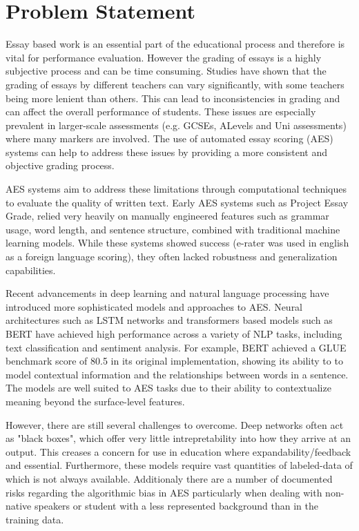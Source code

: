 \documentclass[11pt]{article}
\begin{document}
\section*{Problem Statement}
Essay based work is an essential part of the educational process and therefore is vital for performance evaluation. However
the grading of essays is a highly subjective process and can be time consuming. Studies have shown that the grading of essays
by different teachers can vary significantly, with some teachers being more lenient than others. This can lead to inconsistencies
in grading and can affect the overall performance of students. These issues are especially prevalent in larger-scale assessments 
(e.g. GCSEs, ALevels and Uni assessments) where many markers are involved. The use of automated essay scoring (AES) systems can help 
to address these issues by providing a more consistent and objective grading process.

AES systems aim to address these limitations through computational techniques to evaluate the quality of written text. Early AES systems 
such as Project Essay Grade, relied very heavily on manually engineered features such as grammar usage, word length, and sentence structure, combined with
traditional machine learning models. While these systems showed success (e-rater was used in english as a foreign language scoring), they often lacked
robustness and generalization capabilities.

Recent advancements in deep learning and natural language processing have introduced more sophisticated models and approaches to AES.
Neural architectures such as LSTM networks and transformers based models such as BERT have achieved high performance across a variety of NLP tasks, 
including text classification and sentiment analysis. For example, BERT achieved a GLUE benchmark score of 80.5 in its original implementation, showing its
ability to to model contextual information and the relationships between words in a sentence. The models are well suited to AES tasks due to their ability to 
contextualize meaning beyond the surface-level features.

However, there are still several challenges to overcome. Deep networks often act as "black boxes", which offer very little intrepretability into how they arrive
at an output. This creases a concern for use in education where expandability/feedback and essential. Furthermore, these models require vast quantities of 
labeled-data of which is not always available. Additionaly there are a number of documented risks regarding the algorithmic bias in AES particularly when
dealing with non-native speakers or student with a less represented background than in the training data.
\end{document}
